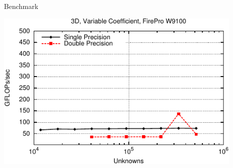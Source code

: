 \begin{frame}{Benchmark}
 \begin{center}
  \includegraphics[width=0.9\textwidth]{figures/amd_3d_variable-crop}
 \end{center}
\end{frame}

